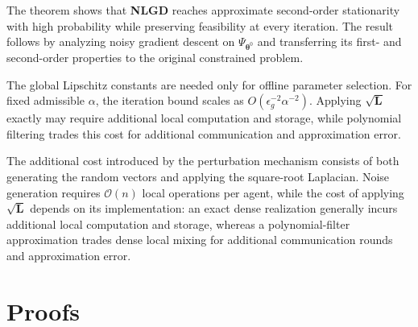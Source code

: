\documentclass{siamart251216}
\begin{document}
The theorem shows that \textbf{NLGD} reaches approximate second-order stationarity with high probability while preserving feasibility at every iteration. The result follows by analyzing noisy gradient descent on $\Psi_{\boldsymbol{\theta}^{0}}$ and transferring its first- and second-order properties to the original constrained problem.

\begin{remark}
    The global Lipschitz constants are needed only for offline parameter selection. For fixed admissible $\alpha$, the iteration bound scales as $O(\epsilon_g^{-2}\alpha^{-2})$. Applying $\sqrt{\mathbf{L}}$ exactly may require additional local computation and storage, while polynomial filtering trades this cost for additional communication and approximation error.
\end{remark}

The additional cost introduced by the perturbation mechanism consists of both generating the random vectors and applying the square-root Laplacian. Noise generation requires $\mathcal{O}(n)$ local operations per agent, while the cost of applying $\sqrt{\mathbf{L}}$ depends on its implementation: an exact dense realization generally incurs additional local computation and storage, whereas a polynomial-filter approximation trades dense local mixing for additional communication rounds and approximation error.%

\section{Proofs}
\label{sec: Proofs}
\end{document}
